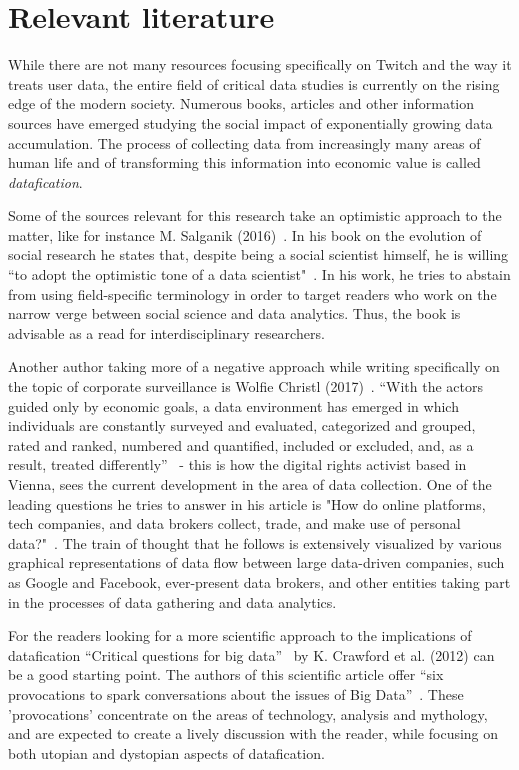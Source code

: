 \section{Relevant literature}
While there are not many resources focusing specifically on Twitch and the way it treats user data, the entire field of critical data studies is currently on the rising edge of the modern society. Numerous books, articles and other information sources have emerged studying the social impact of exponentially growing data accumulation. The process of collecting data from increasingly many areas of human life and of transforming this information into economic value is called \textit{datafication}. 

Some of the sources relevant for this research take an optimistic approach to the matter, like for instance M. Salganik (2016)~\cite{seminar-salganik}. In his book on the evolution of social research he states that, despite being a social scientist himself, he is willing ``to adopt the optimistic tone of a data scientist"~\cite{seminar-salganik}. In his work, he tries to abstain from using field-specific terminology in order to target readers who work on the narrow verge between social science and data analytics. Thus, the book is advisable as a read for interdisciplinary researchers. 

Another author taking more of a negative approach while writing specifically on the topic of corporate surveillance is Wolfie Christl (2017)~\cite{seminar-christl}. ``With the actors guided only by economic goals, a data environment has emerged in which individuals are constantly surveyed and evaluated, categorized and grouped, rated and ranked, numbered and quantified, included or excluded, and, as a result, treated differently''~\cite{seminar-christl} - this is how the digital rights activist based in Vienna, sees the current development in the area of data collection. One of the leading questions he tries to answer in his article is "How do online platforms, tech companies, and data brokers collect, trade, and make use of personal data?"~\cite{seminar-christl}. The train of thought that he follows is extensively visualized by various graphical representations of data flow between large data-driven companies, such as Google and Facebook, ever-present data brokers, and other entities taking part in the processes of data gathering and data analytics. 

For the readers looking for a more scientific approach to the implications of datafication ``Critical questions for big data''~\cite{seminar-crawford} by K. Crawford et al. (2012) can be a good starting point. The authors of this scientific article offer ``six provocations to spark conversations about the issues of Big Data''~\cite{seminar-crawford}. These 'provocations' concentrate on the areas of technology, analysis and mythology, and are expected to create a lively discussion with the reader, while focusing on both utopian and dystopian aspects of datafication. 

